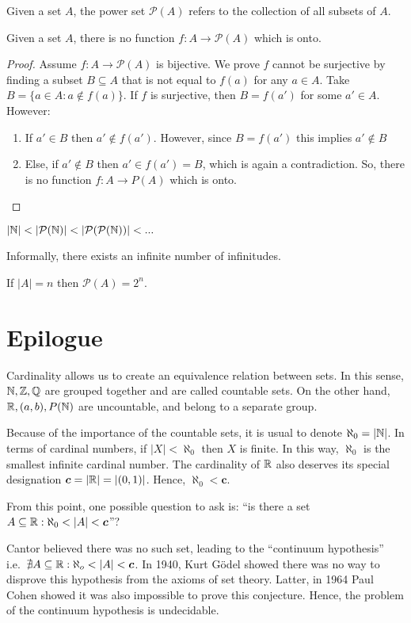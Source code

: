 Given a set $A$, the power set $\mathcal{P}(A)$ refers to the collection of all subsets of $A$.

\begin{theorem}
    Given a set $A$, there is no function $f: A \to \mathcal{P}(A)$ which is onto.    
\end{theorem}

\begin{proof}
    Assume $f: A \to \mathcal{P}(A)$ is bijective. We prove $f$ cannot be surjective by finding a subset $B \subseteq A$ that is not equal to $f(a)$ for any $a \in A$. Take $B = \{a \in A: a \notin f(a)\}$. If $f$ is surjective, then $B = f(a')$ for some $a' \in A$. However: \\
    \begin{enumerate}
        \item If $a' \in B$ then $a' \notin f(a')$. However, since $B = f(a')$ this implies $a' \notin B$
        \item Else, if $a' \notin B$ then $a' \in f(a') = B$, which is again a contradiction. So, there is no function $f: A \to P(A)$ which is onto.    
    \end{enumerate}
\end{proof}

\begin{theorem}
    $|\mathbb{N}| < |\mathcal{P}(\mathbb{N})| < |\mathcal{P}(\mathcal{P}(\mathbb{N}))| < ...$
\end{theorem}

Informally, there exists an infinite number of infinitudes.

\begin{theorem}
    If $|A| = n$ then $\mathcal{P}(A) = 2^n$.
\end{theorem}

\section{Epilogue}

Cardinality allows us to create an equivalence relation between sets. In this sense, $\mathbb{N}, \mathbb{Z}, \mathbb{Q}$ are grouped together and are called countable sets. On the other hand, $\mathbb{R}, (a,b), P(\mathbb{N})$ are uncountable, and belong to a separate group.


Because of the importance of the countable sets, it is usual to denote $\aleph_0 = |\mathbb{N}|$. In terms of cardinal numbers, if $|X| < \aleph_0$ then $X$ is finite. In this way, $\aleph_0$ is the smallest infinite cardinal number. The cardinality of $\mathbb{R}$ also deserves its special designation $\bm c = |\mathbb{R}| = |(0,1)|$. Hence, $\aleph_0 < \bm{c}$.

From this point, one possible question to ask is: ``is there a set $A \subseteq \mathbb{R}: \aleph_0 < |A| < \bm c$''?

Cantor believed there was no such set, leading to the ``continuum hypothesis'' i.e.~$\nexists A \subseteq \mathbb{R}: \aleph_o < |A| < \bm c$. In 1940, Kurt Gödel showed there was no way to disprove this hypothesis from the axioms of set theory. Latter, in 1964 Paul Cohen showed it was also impossible to prove this conjecture. Hence, the problem of the continuum hypothesis is undecidable.